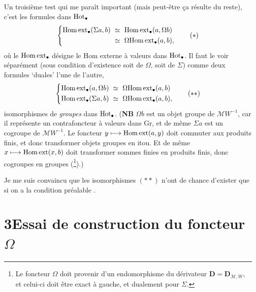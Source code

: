 Un troisième test  qui me paraît important (mais peut-être ça résulte du reste), c'est les formules dans $\mathrm{Hot}_\bullet$
\[
\left\{
\begin{aligned}
\Homext_\bullet(\Sigma a, b) \ &\simeq\ \Homext_\bullet(a, \Omega b)\\
&\simeq\ \Omega\Homext_\bullet(a, b),
\end{aligned}
\right.
\tag*{$(*)$}
\]
où le $\mathrm{Hom\,ext}_\bullet$ désigne le Hom externe à valeurs dans $\mathrm{Hot}_\bullet$. Il faut le voir séparément (sous condition d'existence soit de $\Omega$, soit de $\Sigma$) comme deux formules `duales' l'une de l'autre,
\[
\left\{
\begin{aligned}
\Homext_\bullet(a, \Omega b) \ &\simeq\ \Omega\Homext_\bullet(a, b)\\
\Homext_\bullet(\Sigma a, b) \ &\simeq\ \Omega\Homext_\bullet(a, b),
\end{aligned}
\right.
\tag*{$(**)$}
\]
isomorphismes de \textit{groupes} dans $\mathrm{Hot}_\bullet$. (\textbf{NB} $\Omega b$ est un objet groupe de $\mathcal{M}W^{-1}$, car il représente un contrafoncteur à valeurs dans Gr, et de même $\Sigma a$ est un cogroupe de $\mathcal{M}W^{-1}$. Le foncteur $y \longmapsto \mathrm{Hom\,ext}(a, y)$ doit commuter aux produits finis, et donc transformer objets groupes en itou. Et de même $x \longmapsto \mathrm{Hom\,ext}(x, b)$ doit transformer sommes finies en produits finis, donc cogroupes en groupes (\footnote[8]{Le foncteur $\Omega$ doit provenir d'un endomorphisme du dérivateur $\mathbf{D} = \mathbf{D}_{\mathcal{M},W}$, et celui-ci doit être exact à gauche, et dualement pour $\Sigma$.}).)

Je me suis convaincu que les isomorphismes $(**)$ n'ont de chance d'exister que si on a la condition préalable .

\newpage



\section*{3\quad Essai de construction du foncteur $\Omega$}

